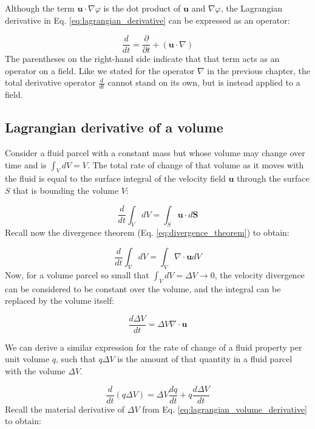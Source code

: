 \documentclass[12pt]{article}
\numberwithin{equation}{section}
\numberwithin{figure}{section}
\numberwithin{table}{section}
\begin{document}
Although the term $\mathbf{u} \cdot \nabla \varphi$ is the dot product of
$\mathbf{u}$ and $\nabla \varphi$, the Lagrangian derivative in Eq.
\ref{eq:lagrangian_derivative} can be expressed as an operator:

\begin{equation}
  \frac{d}{dt} = \frac{\partial}{\partial t} + (\mathbf{u} \cdot \nabla)
\end{equation}
The parentheses on the right-hand side indicate that that term acts as an
operator on a field.
Like we stated for the operator $\nabla$ in the previous chapter, the total
derivative operator $\frac{d}{dt}$ cannot stand on its own, but is instead
applied to a field.

\subsection{Lagrangian derivative of a volume}

Consider a fluid parcel with a constant mass but whose volume may change over
time and is $\int_V dV = V$.
The total rate of change of that volume as it moves with the fluid is equal to
the surface integral of the velocity field $\mathbf{u}$ through the surface
$S$ that is bounding the volume $V$:

\begin{equation}
  \frac{d}{dt}\int_V dV = \int_S \mathbf{u} \cdot d\mathbf{S}
\end{equation}
Recall now the divergence theorem (Eq. \ref{eq:divergence_theorem}) to obtain:

\begin{equation}
  \frac{d}{dt}\int_V dV = \int_V \nabla \cdot \mathbf{u} dV
\end{equation}
Now, for a volume parcel so small that $\int_V dV = \Delta V \to 0$, the
velocity divergence can be considered to be constant over the volume, and the
integral can be replaced by the volume itself:

\begin{equation}
  \frac{d\Delta V}{dt} = \Delta V \nabla \cdot \mathbf{u}
  \label{eq:lagrangian_volume_derivative}
\end{equation}

We can derive a similar expression for the rate of change of a fluid property
per unit volume $q$, such that $q \Delta V$ is the amount of that quantity in
a fluid parcel with the volume $\Delta V$.

\begin{equation}
  \frac{d}{dt} (q \Delta V) = \Delta V \frac{dq}{dt} + q \frac{d\Delta V}{dt}
\end{equation}
Recall the material derivative of $\Delta V$ from Eq. \ref{eq:lagrangian_volume_derivative}
to obtain:
\end{document}

